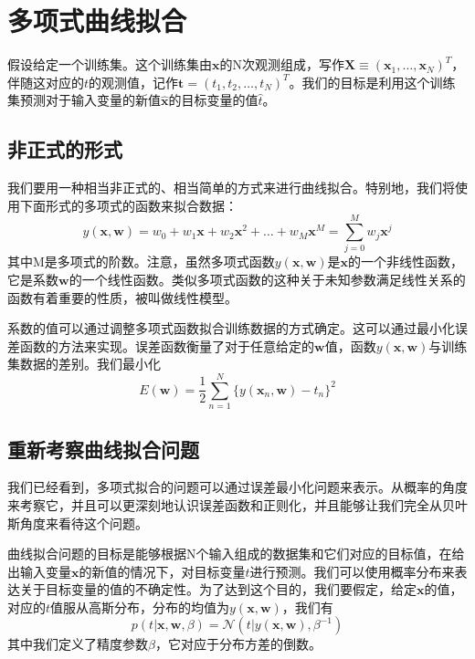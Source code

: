\section{多项式曲线拟合}
假设给定一个训练集。这个训练集由$\boldsymbol{x}$的N次观测组成，写作$\boldsymbol{X}\equiv(\boldsymbol{x}_1,\dots,\boldsymbol{x}_N)^T$，伴随这对应的$t$的观测值，记作$\boldsymbol{t}=(t_1,t_2,\dots,t_N)^T$。我们的目标是利用这个训练集预测对于输入变量的新值$\hat{\boldsymbol{x}}$的目标变量的值$\hat{t}$。
\subsection*{非正式的形式}
我们要用一种相当非正式的、相当简单的方式来进行曲线拟合。特别地，我们将使用下面形式的多项式的函数来拟合数据：
\begin{equation}
	y(\boldsymbol{x},\boldsymbol{w})=w_0+w_1\boldsymbol{x}+w_2\boldsymbol{x}^2+\dots+w_M\boldsymbol{x}^M=\sum_{j=0}^{M}w_j\boldsymbol{x}^j
\end{equation}
其中M是多项式的阶数。注意，虽然多项式函数$y(\boldsymbol{x},\boldsymbol{w})$是$\boldsymbol{x}$的一个非线性函数，它是系数$\boldsymbol{w}$的一个线性函数。类似多项式函数的这种关于未知参数满足线性关系的函数有着重要的性质，被叫做线性模型。

系数的值可以通过调整多项式函数拟合训练数据的方式确定。这可以通过最小化误差函数的方法来实现。误差函数衡量了对于任意给定的$\boldsymbol{w}$值，函数$y(\boldsymbol{x},\boldsymbol{w})$与训练集数据的差别。我们最小化
\begin{equation}
	E(\boldsymbol{w})=\frac{1}{2}\sum_{n=1}^{N}\{y(\boldsymbol{x}_n,\boldsymbol{w})-t_n\}^2
\end{equation}
\subsection*{重新考察曲线拟合问题}
我们已经看到，多项式拟合的问题可以通过误差最小化问题来表示。从概率的角度来考察它，并且可以更深刻地认识误差函数和正则化，并且能够让我们完全从贝叶斯角度来看待这个问题。


曲线拟合问题的目标是能够根据N个输入组成的数据集和它们对应的目标值，在给出输入变量$\boldsymbol{x}$的新值的情况下，对目标变量$t$进行预测。我们可以使用概率分布来表达关于目标变量的值的不确定性。为了达到这个目的，我们要假定，给定$\boldsymbol{x}$的值，对应的$t$值服从高斯分布，分布的均值为$y(\boldsymbol{x},\boldsymbol{w})$，我们有
\begin{equation}
\label{160}
	p(t|\boldsymbol{x},\boldsymbol{w},\beta)=\mathcal{N}(t|y(\boldsymbol{x},\boldsymbol{w}),\beta^{-1})
\end{equation}
其中我们定义了精度参数$\beta$，它对应于分布方差的倒数。

